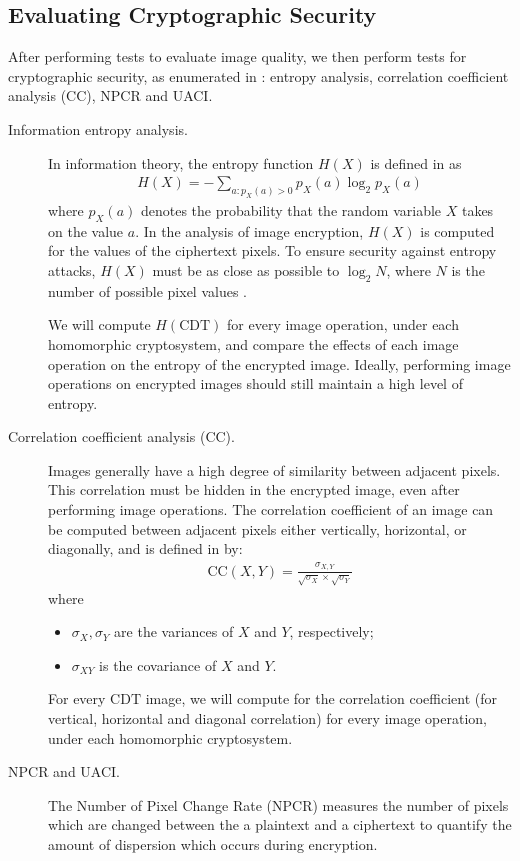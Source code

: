\subsection{Evaluating Cryptographic Security}
After performing tests to evaluate image quality, we then perform tests for cryptographic security, as enumerated in \cite{ahmed_benchmark_2016}: entropy analysis, correlation coefficient analysis (CC), NPCR and UACI.
\begin{description}
	\item [Information entropy analysis.] In information theory, the entropy function $H(X)$ is defined in \cite{bauer_information_2005} as
	\begin{align}
		H(X) = - \sum_{a:p_X(a)>0}{p_X(a)\log_2{p_X(a)}}
	\end{align}
	where $p_X(a)$ denotes the probability that the random variable $X$ takes on the value $a$.
	In the analysis of image encryption, $H(X)$ is computed for the values of the ciphertext pixels. To ensure security against entropy attacks, $H(X)$ must be as close as possible to $\log_2{N}$, where $N$ is the number of possible pixel values \cite{ahmed_benchmark_2016}.

    We will compute $H(\mathrm{CDT})$ for every image operation, under each homomorphic cryptosystem, and compare the effects of each image operation on the entropy of the encrypted image. Ideally, performing image operations on encrypted images should still maintain a high level of entropy.
	\item [Correlation coefficient analysis (CC).]
		Images generally have a high degree of similarity between adjacent pixels. This correlation must be hidden in the encrypted image, even after performing image operations.
		The correlation coefficient of an image can be computed between adjacent pixels either vertically, horizontal, or diagonally, and is defined in \cite{ahmed_benchmark_2016} by:
		\begin{align}
            \mathrm{CC}(X,Y) = \frac{\sigma_{X,Y}}{\sqrt{\sigma_X}\times\sqrt{\sigma_Y}}
		\end{align}
		where
		\begin{itemize}
			\item $\sigma_X, \sigma_Y$ are the variances of $X$ and $Y$, respectively;
			\item $\sigma_{XY}$ is the covariance of $X$ and $Y$.
		\end{itemize}

        For every $\mathrm{CDT}$ image, we will compute for the correlation coefficient (for vertical, horizontal and diagonal correlation) for every image operation, under each homomorphic cryptosystem.
	\item [NPCR and UACI.]
		The Number of Pixel Change Rate (NPCR) measures the number of pixels which are changed between the a plaintext and a ciphertext to quantify the amount of dispersion which occurs during encryption.


\end{description}

